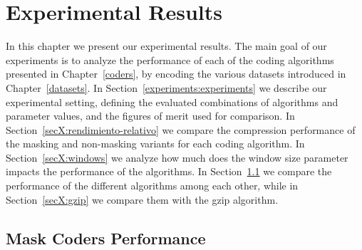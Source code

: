 \chapter{Experimental Results} %

\label{experiments} %


\newcommand{\maskalgo}{\textit{M}}
\newcommand{\NOmaskalgo}{\textit{NM}}
\newcommand{\coder}{\textit{c}}
\newcommand{\difrelativa}{\textit{RD}}
\newcommand{\tasacompresion}{\textit{CR}}
\newcommand{\nmbits}{\NOmaskalgo_{\textit{S}}}
\newcommand{\mbits}{\maskalgo_\textit{S}}
\newcommand{\cmaskalgo}{$c_\maskalgo$}
\newcommand{\cNOmaskalgo}{$c_\NOmaskalgo$}
\newcommand{\ca}{\textit{CI}}
\newcommand{\algo}{\textit{c}}




In this chapter we present our experimental results. The main goal of our experiments is to analyze the performance of each of the coding algorithms presented in Chapter~\ref{coders}, by encoding the various datasets introduced in Chapter~\ref{datasets}. In Section~\ref{experiments:experiments} we describe our experimental setting, defining the evaluated combinations of algorithms and parameter values, and the figures of merit used for comparison. In Section~\ref{secX:rendimiento-relativo} we compare the compression performance of the masking and non-masking variants for each coding algorithm. In Section~\ref{secX:windows} we analyze how much does the window size parameter impacts the performance of the algorithms. In Section~\ref{secX:codersmask} we compare the performance of the different algorithms among each other, while in Section~\ref{secX:gzip} we compare them with the gzip algorithm.





















\clearpage
\section{Mask Coders Performance}
\label{secX:codersmask}

